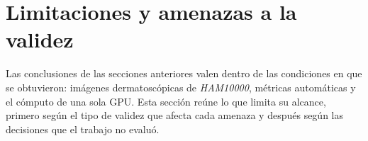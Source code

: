 \section{Limitaciones y amenazas a la validez}
\label{sec:disc_limitaciones}

Las conclusiones de las secciones anteriores valen dentro de las condiciones en que se obtuvieron: imágenes
dermatoscópicas de \emph{HAM10000}, métricas automáticas y el cómputo de una sola GPU. Esta sección reúne lo que
limita su alcance, primero según el tipo de validez que afecta cada amenaza y después según las decisiones que el
trabajo no evaluó.

